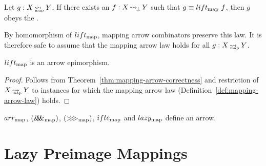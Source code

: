 \begin{definition}
\label{def:mapping-arrow-law}
Let $g : X \operatorname{\rightsquigarrow_{\mspace{-21mu}_\mathrm{map}}} Y$. If there exists an $f : X \operatorname{\rightsquigarrow_{\mspace{-3mu}\bot}} Y$ such that $g \equiv lift_\mathrm{map}~f$, then $g$ obeys the .%
\end{definition}

By homomorphism of $lift_\mathrm{map}$, mapping arrow combinators preserve this law.
It is therefore safe to assume that the mapping arrow law holds for all $g : X \operatorname{\rightsquigarrow_{\mspace{-21mu}_\mathrm{map}}} Y$.

\begin{theorem}
$lift_\mathrm{map}$ is an arrow epimorphism.
\end{theorem}
\begin{proof}
Follows from Theorem~\ref{thm:mapping-arrow-correctness} and restriction of $X \operatorname{\rightsquigarrow_{\mspace{-21mu}_\mathrm{map}}} Y$ to instances for which the mapping arrow law (Definition~\ref{def:mapping-arrow-law}) holds.
\end{proof}

\begin{corollary}
$arr_\mathrm{map}$, $(\mathit{\&\mspace{-7.5mu}\&\mspace{-7.5mu}\&}_\mathrm{map})$, $({>}\mspace{-6mu}{>}\mspace{-6mu}{>}_\mathrm{map})$, $ifte_\mathrm{map}$ and $lazy_\mathrm{map}$ define an arrow.
\end{corollary}



\section{Lazy Preimage Mappings}
\label{sec:lazy-preimage-mappings}

